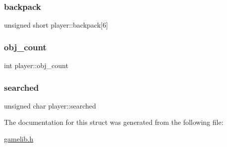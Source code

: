 \mbox{\label{structplayer_a8d5595c727db605ca67db92df02bfc86}} 
\subsubsection{\texorpdfstring{backpack}{backpack}}
{\footnotesize\ttfamily unsigned short player\+::backpack\mbox{[}6\mbox{]}}

\mbox{\label{structplayer_a8cf792a21c4f21d1b625abe9fcf65cf2}} 
\subsubsection{\texorpdfstring{obj\+\_\+count}{obj\_count}}
{\footnotesize\ttfamily int player\+::obj\+\_\+count}

\mbox{\label{structplayer_a23a60ae030319477cc975d0d8fa9d4f8}} 
\subsubsection{\texorpdfstring{searched}{searched}}
{\footnotesize\ttfamily unsigned char player\+::searched}



The documentation for this struct was generated from the following file\+:\begin{DoxyCompactItemize}
\item 
\hyperlink{gamelib_8h}{gamelib.\+h}\end{DoxyCompactItemize}
